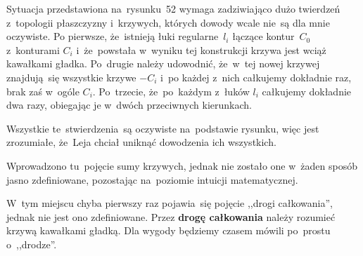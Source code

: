 \documentclass[a4paper,11pt]{article}
\begin{document}
\vspace{\spaceFour}


\start {} Sytuacja przedstawiona na~rysunku~52 wymaga
zadziwiająco dużo twierdzeń z~topologii płaszczyzny i~krzywych,
których dowody wcale nie~są dla mnie oczywiste. Po pierwsze,
że~istnieją łuki regularne~$l_{ i }$ łączące kontur~$C_{ 0 }$
z~konturami $C_{ i }$ i~że~powstała w~wyniku tej konstrukcji krzywa
jest wciąż kawałkami gładka. Po~drugie należy udowodnić, że~w~tej
nowej krzywej znajdują~się wszystkie krzywe $-C_{ i }$ i~po każdej
z~nich całkujemy dokładnie raz, brak zaś w~ogóle $C_{ i }$.
Po~trzecie, że~po~każdym z~łuków $l_{ i }$ całkujemy dokładnie dwa
razy, obiegając je w~dwóch przeciwnych kierunkach.

Wszystkie te~stwierdzenia~są oczywiste na~podstawie rysunku, więc jest
zrozumiałe, że~Leja chciał uniknąć dowodzenia ich wszystkich.

\vspace{\spaceFour}


\start {} Wprowadzono tu~pojęcie sumy krzywych, jednak nie
zostało one w~żaden sposób jasno zdefiniowane, pozostając na~poziomie
intuicji matematycznej.

\vspace{\spaceFour}


\start {} W~tym miejscu chyba pierwszy raz pojawia~się pojęcie
,,drogi całkowania'', jednak nie jest ono zdefiniowane. Przez
\textbf{drogę całkowania} należy rozumieć krzywą kawałkami gładką. Dla
wygody będziemy czasem mówili po~prostu o~,,drodze''.

\vspace{\spaceFour}
\end{document}
